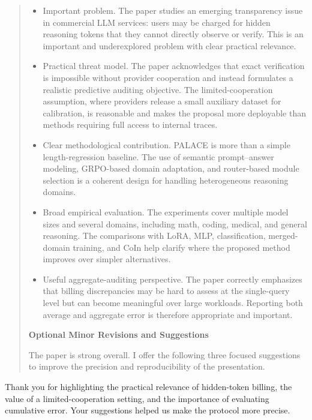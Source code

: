 \documentclass[11pt]{article}
\begin{document}
\begin{quote}
\begin{itemize}
\item Important problem. The paper studies an emerging transparency issue in commercial LLM services: users may be charged for hidden reasoning tokens that they cannot directly observe or verify. This is an important and underexplored problem with clear practical relevance.
\item Practical threat model. The paper acknowledges that exact verification is impossible without provider cooperation and instead formulates a realistic predictive auditing objective. The limited-cooperation assumption, where providers release a small auxiliary dataset for calibration, is reasonable and makes the proposal more deployable than methods requiring full access to internal traces.
\item Clear methodological contribution. PALACE is more than a simple length-regression baseline. The use of semantic prompt–answer modeling, GRPO-based domain adaptation, and router-based module selection is a coherent design for handling heterogeneous reasoning domains.
\item Broad empirical evaluation. The experiments cover multiple model sizes and several domains, including math, coding, medical, and general reasoning. The comparisons with LoRA, MLP, classification, merged-domain training, and CoIn help clarify where the proposed method improves over simpler alternatives.
\item Useful aggregate-auditing perspective. The paper correctly emphasizes that billing discrepancies may be hard to assess at the single-query level but can become meaningful over large workloads. Reporting both average and aggregate error is therefore appropriate and important.
\end{itemize}
\textbf{Optional Minor Revisions and Suggestions}

The paper is strong overall. I offer the following three focused suggestions to improve the precision and reproducibility of the presentation.
\end{quote}

Thank you for highlighting the practical relevance of hidden-token billing, the value of a limited-cooperation setting, and the importance of evaluating cumulative error. Your suggestions helped us make the protocol more precise.
\end{document}
